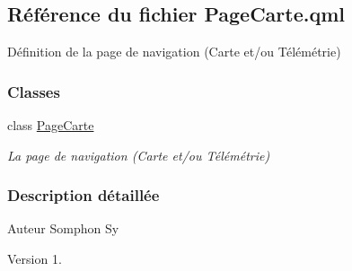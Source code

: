 \hypertarget{_page_carte_8qml}{}\subsection{Référence du fichier Page\+Carte.\+qml}
\label{_page_carte_8qml}


Définition de la page de navigation (Carte et/ou Télémétrie)  


\subsubsection*{Classes}
\begin{DoxyCompactItemize}
\item 
class \hyperlink{class_page_carte}{Page\+Carte}
\begin{DoxyCompactList}\small\item\em La page de navigation (Carte et/ou Télémétrie) \end{DoxyCompactList}\end{DoxyCompactItemize}


\subsubsection{Description détaillée}
\begin{DoxyAuthor}{Auteur}
Somphon Sy
\end{DoxyAuthor}
\begin{DoxyVersion}{Version}
1. 
\end{DoxyVersion}
